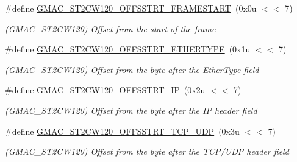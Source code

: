 \begin{DoxyCompactItemize}
\item 
\mbox{\label{group__SAME70__GMAC_ga47d76bc97dc59999215727aee7a738d5}} 
\#define \mbox{\hyperlink{group__SAME70__GMAC_ga47d76bc97dc59999215727aee7a738d5}{G\+M\+A\+C\+\_\+\+S\+T2\+C\+W120\+\_\+\+O\+F\+F\+S\+S\+T\+R\+T\+\_\+\+F\+R\+A\+M\+E\+S\+T\+A\+RT}}~(0x0u $<$$<$ 7)
\begin{DoxyCompactList}\small\item\em (G\+M\+A\+C\+\_\+\+S\+T2\+C\+W120) Offset from the start of the frame \end{DoxyCompactList}\item 
\mbox{\label{group__SAME70__GMAC_ga61bc63b2cf5848b3131afe7ca044c5d5}} 
\#define \mbox{\hyperlink{group__SAME70__GMAC_ga61bc63b2cf5848b3131afe7ca044c5d5}{G\+M\+A\+C\+\_\+\+S\+T2\+C\+W120\+\_\+\+O\+F\+F\+S\+S\+T\+R\+T\+\_\+\+E\+T\+H\+E\+R\+T\+Y\+PE}}~(0x1u $<$$<$ 7)
\begin{DoxyCompactList}\small\item\em (G\+M\+A\+C\+\_\+\+S\+T2\+C\+W120) Offset from the byte after the Ether\+Type field \end{DoxyCompactList}\item 
\mbox{\label{group__SAME70__GMAC_ga27d7cfbf82bbfda6d24c96d9fa757f87}} 
\#define \mbox{\hyperlink{group__SAME70__GMAC_ga27d7cfbf82bbfda6d24c96d9fa757f87}{G\+M\+A\+C\+\_\+\+S\+T2\+C\+W120\+\_\+\+O\+F\+F\+S\+S\+T\+R\+T\+\_\+\+IP}}~(0x2u $<$$<$ 7)
\begin{DoxyCompactList}\small\item\em (G\+M\+A\+C\+\_\+\+S\+T2\+C\+W120) Offset from the byte after the IP header field \end{DoxyCompactList}\item 
\mbox{\label{group__SAME70__GMAC_ga8a02c594997e347dd9f9df7882c05380}} 
\#define \mbox{\hyperlink{group__SAME70__GMAC_ga8a02c594997e347dd9f9df7882c05380}{G\+M\+A\+C\+\_\+\+S\+T2\+C\+W120\+\_\+\+O\+F\+F\+S\+S\+T\+R\+T\+\_\+\+T\+C\+P\+\_\+\+U\+DP}}~(0x3u $<$$<$ 7)
\begin{DoxyCompactList}\small\item\em (G\+M\+A\+C\+\_\+\+S\+T2\+C\+W120) Offset from the byte after the T\+C\+P/\+U\+DP header field \end{DoxyCompactList}\item 
\mbox{\label{group__SAME70__GMAC_ga0c8b6fd17c55bc1b8ff2071e71193af0}} 

\end{DoxyCompactItemize}
